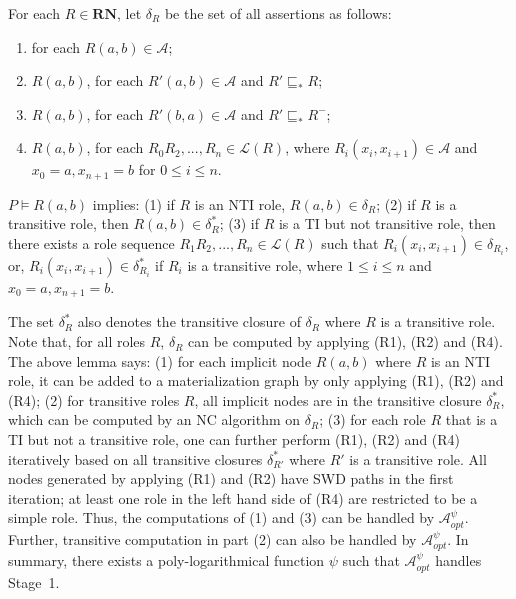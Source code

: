 \documentclass[final,1p,times]{elsarticle}
\begin{document}
\begin{definition}\label{def:deltaRdhlplus}
For each $R\in\textbf{RN}$, let $\delta_R$ be the set of all assertions as follows:
\begin{enumerate}[leftmargin=4ex,label=\arabic*.]
\item for each $R(a,b)\in\mathcal{A}$;
\item $R(a,b)$, for each $R'(a,b)\in\mathcal{A}$ and $R'\sqsubseteq_{*}R$;
\item $R(a,b)$, for each $R'(b,a)\in\mathcal{A}$ and $R'\sqsubseteq_{*}R^-$;
\item $R(a,b)$, for each $R_0R_2,...,R_n\in\mathcal{L}(R)$, where $R_i(x_i,x_{i+1})\in\mathcal{A}$ and $x_0=a, x_{n+1}=b$ for $0\leq i\leq n$.
\end{enumerate}
\end{definition}

\begin{lemma}\label{lemma:tiplus}
$P\models R(a,b)$ implies: (1) if $R$ is an NTI role, $R(a,b)\in\delta_R$;
(2) if $R$ is a transitive role, then $R(a,b)\in\delta^*_R$;
(3) if $R$ is a TI but not transitive role, then there exists a role sequence $R_1R_2,...,R_n\in\mathcal{L}(R)$ such that
$R_i(x_i,x_{i+1})\in\delta_{R_i}$, or, $R_i(x_i,x_{i+1})\in\delta^*_{R_i}$ if $R_i$ is a transitive role,
where $1\leq i\leq n$ and $x_0=a, x_{n+1}=b$.
\end{lemma}

The set $\delta^*_R$ also denotes the transitive closure of $\delta_R$ where $R$ is a transitive role.
Note that, for all roles $R$, $\delta_R$ can be computed by applying (R1), (R2) and (R4).
The above lemma says:
(1) for each implicit node $R(a,b)$ where $R$ is an NTI role,
it can be added to a materialization graph by only applying (R1), (R2) and (R4);
(2) for transitive roles $R$, all implicit nodes are in the transitive closure $\delta^*_{R}$,
which can be computed by an NC algorithm on $\delta_{R}$;
(3) for each role $R$ that is a TI but not a transitive role,
one can further perform (R1), (R2) and (R4) iteratively based on all
transitive closures $\delta^*_{R'}$ where $R'$ is a transitive role.
All nodes generated by applying (R1) and (R2) have SWD paths in the first iteration; at
least one role in the left hand side of (R4) are restricted to be a simple role.
Thus, the computations of (1) and (3) can be handled by $\mathcal{A}_{opt}^\psi$.
Further, transitive computation in part (2) can also be handled by $\mathcal{A}_{opt}^\psi$.
In summary, there exists a poly-logarithmical function $\psi$
such that $\mathcal{A}_{opt}^\psi$ handles Stage~1.
\end{document}
